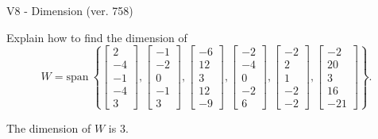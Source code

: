 \begin{exercise}
  \begin{exerciseTitle}V8 - Dimension (ver. 758)\end{exerciseTitle}
  \begin{exerciseStatement}
    Explain how to find the dimension of 
\[W=\mathrm{span}\ \left\{\left[\begin{array}{r}
2 \\
-4 \\
-1 \\
-4 \\
3
\end{array}\right] , \left[\begin{array}{r}
-1 \\
-2 \\
0 \\
-1 \\
3
\end{array}\right] , \left[\begin{array}{r}
-6 \\
12 \\
3 \\
12 \\
-9
\end{array}\right] , \left[\begin{array}{r}
-2 \\
-4 \\
0 \\
-2 \\
6
\end{array}\right] , \left[\begin{array}{r}
-2 \\
2 \\
1 \\
-2 \\
-2
\end{array}\right] , \left[\begin{array}{r}
-2 \\
20 \\
3 \\
16 \\
-21
\end{array}\right]\right\}.\]



  \end{exerciseStatement}
  \begin{exerciseAnswer}
   The dimension of \(W\) is  \(3\).
  


  \end{exerciseAnswer}
\end{exercise}